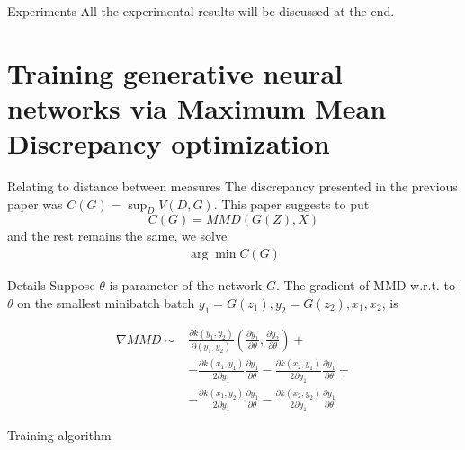 \documentclass{beamer}
\begin{document}
\begin{frame}{Experiments}
All the experimental results will be discussed at the end.
 
\end{frame}


\section{Training generative neural networks via Maximum Mean Discrepancy optimization}

\begin{frame}{Relating to distance between measures}
The discrepancy presented in the previous paper was $C(G) = \sup_{D} V(D,G)$. This paper suggests to put 
\[
 C(G) = MMD(G(Z),X) 
\]
and the rest remains the same, we solve 
\begin{align}
\arg \min C(G)
\end{align}
\end{frame}

\begin{frame}{Details}
Suppose  $\theta$ is parameter  of the network $G$. The gradient of MMD  w.r.t. to $\theta$ on the  smallest minibatch batch 
$y_1 = G(z_1), y_2 = G(z_2),x_1,x_2$, is

\begin{align*}
\nabla MMD \sim & \frac{ \partial k(y_1,y_2) } {\partial (y_1,y_2) } (\frac{\partial y_1}{\partial \theta } ,\frac{ \partial y_2} {\partial \theta }) + \\
   &-\frac{ \partial k(x_1,y_1) }{2\partial y_1} \frac{\partial y_1}{\partial \theta } -  \frac{ \partial k(x_2,y_1) }{2\partial y_1} \frac{\partial y_1}{\partial \theta }+ \\
   & -\frac{ \partial k(x_1,y_2) }{2\partial y_1} \frac{\partial y_1}{\partial \theta } - \frac{ \partial k(x_2,y_2) }{2\partial y_1} \frac{\partial y_1}{\partial \theta }
 \end{align*}


\end{frame}
 



\begin{frame}{Training algorithm}
\end{frame}  
\end{document}
